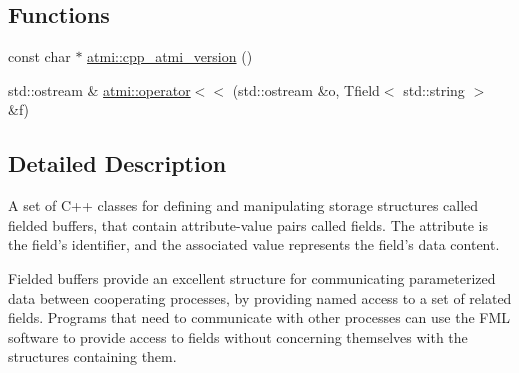 \subsection*{Functions}
\begin{DoxyCompactItemize}
\item 
const char $\ast$ \hyperlink{group__fml_ga1db5d7cd1f711e43cd63dedbd9e3f8d1}{atmi\+::cpp\+\_\+atmi\+\_\+version} ()
\item 
std\+::ostream \& \hyperlink{group__fml_gaf0b4f377c31559db649c37f8df6f9c13}{atmi\+::operator$<$$<$} (std\+::ostream \&o, Tfield$<$ std\+::string $>$ \&f)
\end{DoxyCompactItemize}


\subsection{Detailed Description}
A set of C++ classes for defining and manipulating storage structures called fielded buffers, that contain attribute-\/value pairs called fields. The attribute is the field’s identifier, and the associated value represents the field’s data content.

Fielded buffers provide an excellent structure for communicating parameterized data between cooperating processes, by providing named access to a set of related fields. Programs that need to communicate with other processes can use the F\+M\+L software to provide access to fields without concerning themselves with the structures containing them. 


